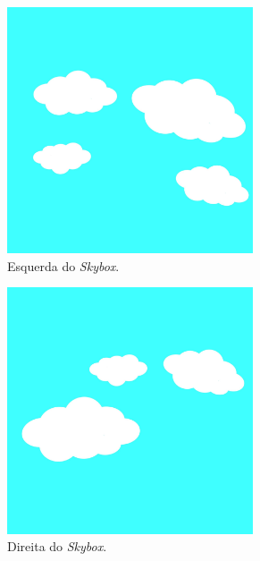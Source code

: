 \begin{figure}[H]
    \begin{subfigure}[t]{0.3\textwidth}
        \centering
        \includegraphics[width=0.8\textwidth]{figuras/left.jpg}
        \caption{Esquerda do \textit{Skybox}.}
    \end{subfigure}
    \hfill
    \begin{subfigure}[t]{0.3\textwidth}
        \centering
        \includegraphics[width=0.8\textwidth]{figuras/right.jpg}
        \caption{Direita do \textit{Skybox}.}
    \end{subfigure}
    \hfill
    \begin{subfigure}[t]{0.3\textwidth}

\end{subfigure}
\end{figure}
